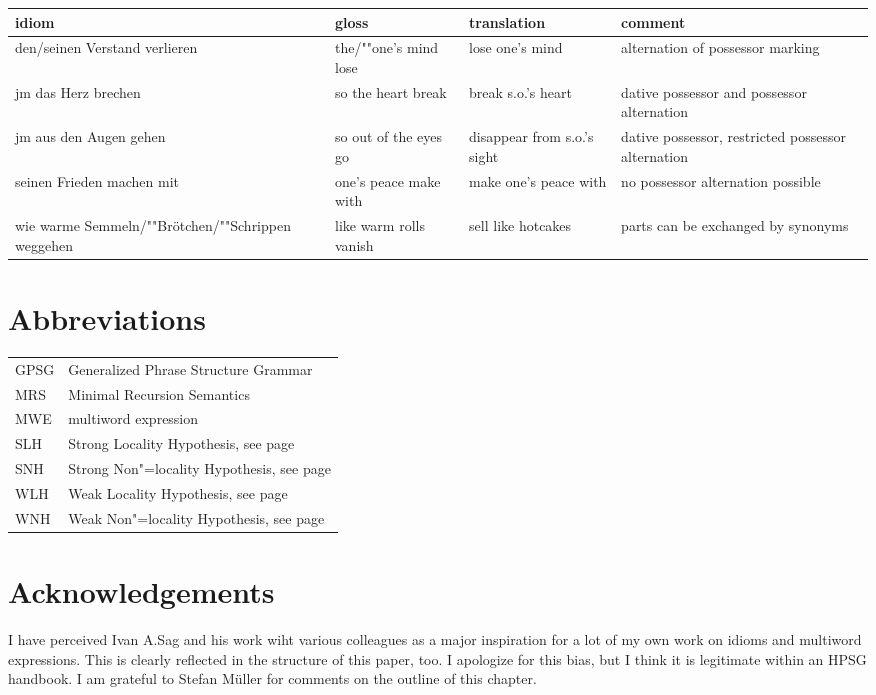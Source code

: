 \documentclass[output=paper]{langsci/langscibook}
\begin{document}
\begin{sideways}
\begin{tabular}{@{}L{4cm}lL{4.0cm}L{4.0cm}}
idiom & gloss & translation & comment\\\hline
%
 {den/seinen Verstand verlieren}
 & {the/""one's mind lose}
 & {lose one's mind}
 & {alternation of possessor marking}
 \\
 {jm das Herz brechen} & so the heart break & break s.o.'s heart
 & {dative possessor and possessor alternation}\\
 {jm aus den Augen gehen} & so out of the eyes go
 & {disappear from s.o.'s sight} &
 {dative possessor, restricted possessor alternation}\\
 {seinen Frieden machen mit}
 & {one's peace make with}
 & {make one's peace with}
 & {no possessor alternation possible}\\
 {wie warme Semmeln/""Brötchen/""Schrippen weggehen}
 & {like warm rolls vanish} & sell like hotcakes & 
 {parts can be exchanged by synonyms}\\
\end{tabular}
\end{sideways}

\section*{Abbreviations}

\begin{tabular}{ll}
GPSG & Generalized Phrase Structure Grammar \citep{GKPS85a}\\
MRS & Minimal Recursion Semantics \citep{CFPS2005a}\\
MWE & multiword expression\\
SLH & Strong Locality Hypothesis, see page \pageref{slh}\\
SNH & Strong Non"=locality Hypothesis, see page \pageref{snh}\\
WLH & Weak Locality Hypothesis, see page \pageref{wlh}\\
WNH & Weak Non"=locality Hypothesis, see page \pageref{wnh}\\
\end{tabular}

\section*{Acknowledgements}

I have perceived Ivan A.\@ Sag and his work wiht various colleagues as a major inspiration for a lot of my own work on idioms and multiword expressions. 
This is clearly reflected in the structure of this paper, too. 
I apologize for this bias, but I think it is legitimate within an HPSG handbook.
%
I am grateful to Stefan Müller for comments on the outline of this chapter. 


{\sloppy
\printbibliography[heading=subbibliography,notkeyword=this] }
\end{document}
